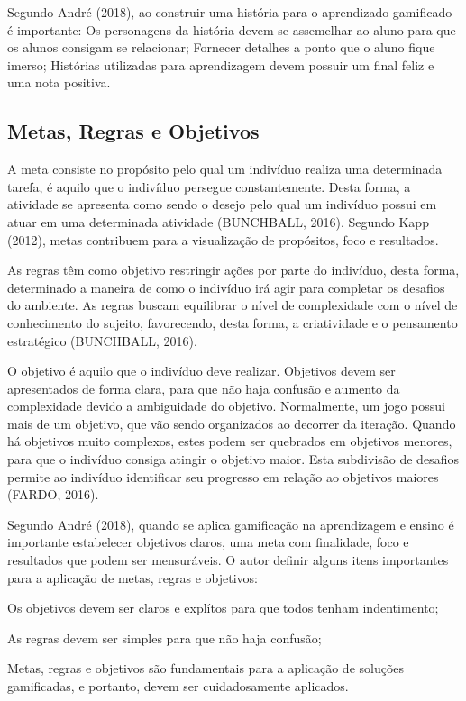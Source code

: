 \documentclass[
	12pt,				%
	oneside,			%
	a4paper,			%
	english,			%
	french,				%
	spanish,			%
	brazil,				%
	]{abntex2}
\begin{document}
Segundo André (2018), ao construir uma história para o aprendizado gamificado é importante:
Os personagens da história devem se assemelhar ao aluno para que os alunos consigam se relacionar;
Fornecer detalhes a ponto que o aluno fique imerso;
Histórias utilizadas para aprendizagem devem possuir um final feliz e uma nota positiva.

\subsection{Metas, Regras e Objetivos}

A meta consiste no propósito pelo qual um indivíduo realiza uma determinada tarefa, é aquilo que o indivíduo persegue constantemente. Desta forma, a atividade se apresenta como sendo o desejo pelo qual um indivíduo possui em atuar em uma determinada atividade (BUNCHBALL, 2016). Segundo Kapp (2012), metas contribuem para a visualização de propósitos, foco e resultados.

As regras têm como objetivo restringir ações por parte do indivíduo, desta forma, determinado a maneira de como o indivíduo irá agir para completar os desafios do ambiente. As regras buscam equilibrar o nível de complexidade com o nível de conhecimento do sujeito, favorecendo, desta forma, a criatividade e o pensamento estratégico (BUNCHBALL, 2016).

O objetivo é aquilo que o indivíduo deve realizar. Objetivos devem ser apresentados de forma clara, para que não haja confusão e aumento da complexidade devido a ambiguidade do objetivo. Normalmente, um jogo possui mais de um objetivo, que vão sendo organizados ao decorrer da iteração. Quando há objetivos muito complexos, estes podem ser quebrados em objetivos menores, para que o indivíduo consiga atingir o objetivo maior. Esta subdivisão de desafios permite ao indivíduo identificar seu progresso em relação ao objetivos maiores (FARDO, 2016).

Segundo André (2018), quando se aplica gamificação na aprendizagem e ensino é importante estabelecer objetivos claros, uma meta com finalidade, foco e resultados que podem ser mensuráveis. O autor definir alguns itens importantes para a aplicação de metas, regras e objetivos:

Os objetivos devem ser claros e explítos para que todos tenham indentimento;

As regras devem ser simples para que não haja confusão;

Metas, regras e objetivos são fundamentais para a aplicação de soluções gamificadas, e portanto, devem ser cuidadosamente aplicados.
\end{document}
